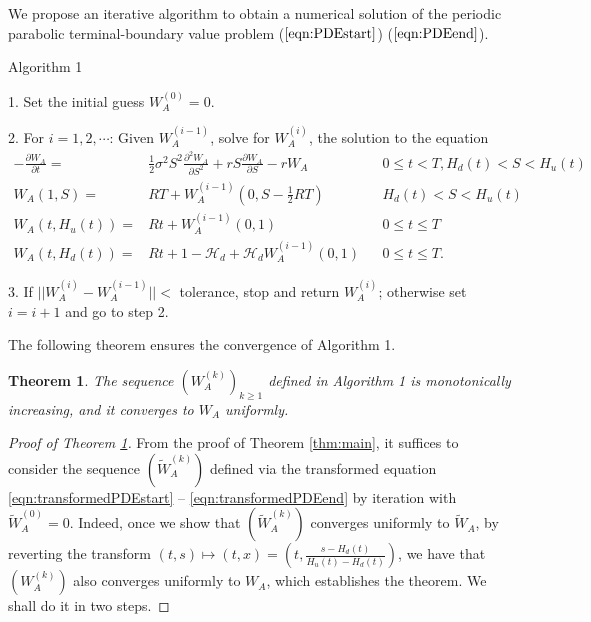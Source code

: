 \documentclass[draft, noinfoline]{ectaart}
\numberwithin{equation}{section}
\theoremstyle{plain}
\newtheorem{theorem}{Theorem}[section]
\begin{document}
\begin{appendices}
We propose an iterative algorithm to obtain a numerical solution of the periodic parabolic terminal-boundary value problem ($\ref{eqn:PDEstart}$) \textendash{} ($\ref{eqn:PDEend}$).

\begin{center}
Algorithm 1
\end{center}

1. Set the initial guess $W_{A}^{(0)}=0$.

2.  For $i=1,2,\cdots$: Given $W_{A}^{(i-1)}$, solve for $W_{A}^{(i)}$, the solution to the equation
\begin{align*}
-\frac{\partial W_{A}}{\partial t}= & \frac{1}{2}\sigma^{2}S^{2}\frac{\partial^{2}W_{A}}{\partial S^{2}}+r S\frac{\partial W_{A}}{\partial S}-r W_{A} &  & 0\le t<T,H_{d}(t)<S<H_{u}(t)\\
W_{A}(1,S)= & RT+W_{A}^{(i-1)}(0,S-\frac{1}{2}RT) &  & H_{d}(t)<S<H_{u}(t)\\
W_{A}(t,H_{u}(t))= & Rt+W_{A}^{(i-1)}(0,1) &  & 0\le t\le T\\
W_{A}(t,H_{d}(t))= & Rt+1-\mathcal{H}_{d}+\mathcal{H}_{d}W_{A}^{(i-1)}(0,1) &  & 0\le t\le T.
\end{align*}


3.  If $||W_{A}^{(i)}-W_{A}^{(i-1)}||<$ tolerance, stop and return $W_{A}^{(i)}$; otherwise set $i=i+1$ and go to step 2.

The following theorem ensures the convergence of Algorithm 1.

\begin{theorem}\label{thm:convergence}
	The sequence $(W_A^{(k)})_{k\ge 1}$ defined in Algorithm 1 is monotonically increasing, and it converges to $W_A$ uniformly.
\end{theorem}
\begin{proof}[Proof of Theorem \ref{thm:convergence}]
	From the proof of Theorem \ref{thm:main}, it suffices to consider the sequence $(\tilde{W}_A^{(k)})$ defined via the transformed equation \eqref{eqn:transformedPDEstart} -- \eqref{eqn:transformedPDEend} by iteration with $\tilde{W}_A^{(0)}=0$. Indeed, once we show that $(\tilde{W}_A^{(k)})$ converges uniformly to $\tilde{W}_A$, by reverting the transform $(t,s)\mapsto(t,x)=\left(t,\frac{s-H_d(t)}{H_u(t)-H_d(t)}\right)$, we have that $(W_{A}^{(k)})$ also converges uniformly to $W_A$, which establishes the theorem. We shall do it in two steps.


\end{proof}
\end{appendices}
\end{document}
